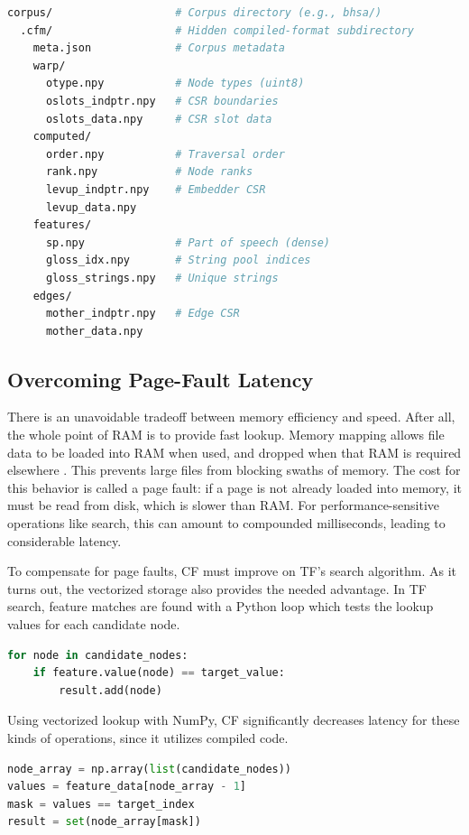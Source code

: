 \documentclass[11pt,a4paper]{article}
\begin{document}
\begin{lstlisting}[language=bash, caption=.cfm directory structure]
corpus/                   # Corpus directory (e.g., bhsa/)
  .cfm/                   # Hidden compiled-format subdirectory
    meta.json             # Corpus metadata
    warp/
      otype.npy           # Node types (uint8)
      oslots_indptr.npy   # CSR boundaries
      oslots_data.npy     # CSR slot data
    computed/
      order.npy           # Traversal order
      rank.npy            # Node ranks
      levup_indptr.npy    # Embedder CSR
      levup_data.npy
    features/
      sp.npy              # Part of speech (dense)
      gloss_idx.npy       # String pool indices
      gloss_strings.npy   # Unique strings
    edges/
      mother_indptr.npy   # Edge CSR
      mother_data.npy
\end{lstlisting}

\subsection{Overcoming Page-Fault Latency}

There is an unavoidable tradeoff between memory efficiency and speed. After all, the whole
point of RAM is to provide fast lookup. Memory mapping allows file data to be loaded into RAM
when used, and dropped when that RAM is required elsewhere \cite{pytorchmmap}. This prevents large files
from blocking swaths of memory. The cost for this behavior is called a page fault:
if a page is not already loaded into memory, it must be read from disk, which is slower
than RAM. For performance-sensitive operations like search, this can amount to compounded
milliseconds, leading to considerable latency.

To compensate for page faults, CF must improve on TF's search algorithm.
As it turns out, the vectorized storage also provides the needed advantage.
In TF search, feature matches are found with a Python loop which tests the lookup values for
each candidate node.

\begin{lstlisting}[language=Python, caption=Per-node iteration (original)]
for node in candidate_nodes:
    if feature.value(node) == target_value:
        result.add(node)
\end{lstlisting}

\noindent Using vectorized lookup with NumPy, CF significantly decreases latency for these kinds of operations,
since it utilizes compiled code.

\begin{lstlisting}[language=Python, caption=Vectorized filtering]
node_array = np.array(list(candidate_nodes))
values = feature_data[node_array - 1]
mask = values == target_index
result = set(node_array[mask])
\end{lstlisting}
\end{document}
